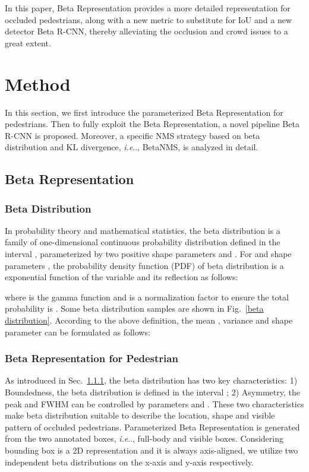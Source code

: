 \documentclass{article}
\makeatletter
\DeclareRobustCommand\onedot{\futurelet\@let@token\@onedot}
\def\@onedot{\ifx\@let@token.\else.\null\fi\xspace}
\def\ie{\emph{i.e}\onedot} \def\Ie{\emph{I.e}\onedot}
\makeatother
\begin{document}
In this paper, Beta Representation provides a more detailed representation for occluded pedestrians, along with a new metric to substitute for IoU and a new detector Beta R-CNN, thereby alleviating the occlusion and crowd issues to a great extent.

\section{Method}
\label{method}
In this section, we first introduce the parameterized Beta Representation for pedestrians.
Then to fully exploit the Beta Representation, a novel pipeline Beta R-CNN is proposed.
Moreover, a specific NMS strategy based on beta distribution and KL divergence, \ie, BetaNMS, is analyzed in detail.

\subsection{Beta Representation}
\label{beta theory}

\subsubsection{Beta Distribution}
\label{beta distribution theory}
In probability theory and mathematical statistics, the beta distribution is a family of one-dimensional continuous probability distribution defined in the interval , parameterized by two positive shape parameters  and .
For  and shape parameters , the probability density function (PDF) of beta distribution is a exponential function of the variable  and its reflection  as follows:

where  is the gamma function and  is a normalization factor to ensure the total probability is . 
Some beta distribution samples are shown in Fig.~\ref{beta distribution}. According to the above definition, the mean , variance  and shape parameter  can be formulated as follows:

    
\subsubsection{Beta Representation for Pedestrian}
As introduced in Sec.~\ref{beta distribution theory}, the beta distribution has two key characteristics: 1) Boundedness, the beta distribution is defined in the interval ; 2) Asymmetry, the peak and FWHM can be controlled by parameters  and . 
These two characteristics make beta distribution suitable to describe the location, shape and visible pattern of occluded pedestrians.
Parameterized Beta Representation is generated from the two annotated boxes, \ie, full-body and visible boxes.
Considering bounding box is a 2D representation and it is always axis-aligned, we utilize two independent beta distributions on the x-axis and y-axis respectively. 
\end{document}
